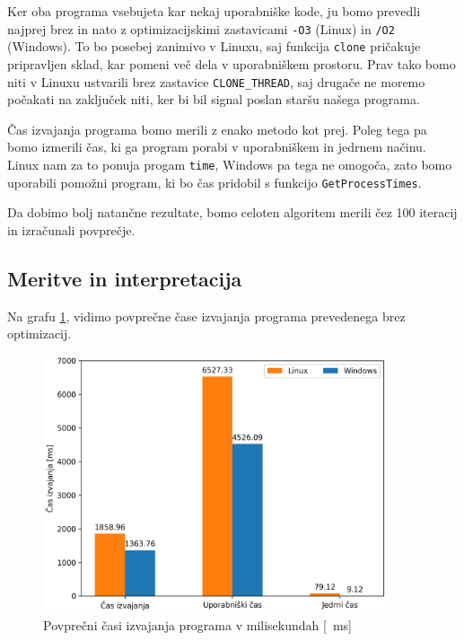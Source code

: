 \documentclass[a4paper,12pt,openright]{book}
\begin{document}
Ker oba programa vsebujeta kar nekaj uporabniške kode, ju bomo prevedli najprej brez in nato z optimizacijskimi zastavicami \texttt{-O3} (Linux) in \texttt{/O2} (Windows).
To bo posebej zanimivo v Linuxu, saj funkcija \texttt{clone} pričakuje pripravljen sklad, kar pomeni več dela v uporabniškem prostoru.
Prav tako bomo niti v Linuxu ustvarili brez zastavice \texttt{CLONE\_THREAD}, saj drugače ne moremo počakati na zaključek niti, ker bi bil signal poslan staršu našega programa.

Čas izvajanja programa bomo merili z enako metodo kot prej.
Poleg tega pa bomo izmerili čas, ki ga program porabi v uporabniškem in jedrnem načinu.
Linux nam za to ponuja progam \texttt{time}, Windows pa tega ne omogoča, zato bomo uporabili pomožni program, ki bo čas pridobil s funkcijo \texttt{GetProcessTimes}.

Da dobimo bolj natančne rezultate, bomo celoten algoritem merili čez 100 iteracij in izračunali povprečje.

\subsection{Meritve in interpretacija}

Na grafu \ref{fig:program_comparison:times}, vidimo povprečne čase izvajanja programa prevedenega brez optimizacij.

\begin{figure}[h!]
	\begin{center}
		\includegraphics[width=0.9\textwidth]{images/program_comparison.png}
	\end{center}
	\caption{Povprečni časi izvajanja programa v milisekundah [\SI{}{\milli\second}]}
	\label{fig:program_comparison:times}
\end{figure}
\end{document}
